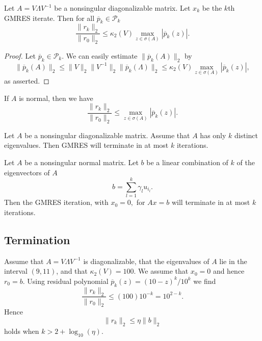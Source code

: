 \begin{thm}
  Let $A=V\Lambda V^{-1}$ be a nonsingular diagonalizable matrix. Let
  $x_k$ be the $k$th GMRES iterate. Then for all
  $\overline{p}_k\in\mathcal{P}_k$
  \begin{equation}
    \label{eq:3.4}
    \frac{\|r_k\|_2}{\|r_0\|_2}\leq \kappa_2(V)\max_{z\in\sigma(A)}|\overline{p}_k(z)|.
  \end{equation}
\end{thm}

\begin{proof}
  Let $\overline{p}_k\in\mathcal{P}_k.$ We can easily estimate
  $\|\overline{p}_k(A)\|_2$ by
  $$\|\overline{p}_k(A)\|_2\leq
  \|V\|_2\|V^{-1}\|_2\|\overline{p}_k(\Lambda)\|_2\leq
  \kappa_2(V)\max_{z\in\sigma(A)}|\overline{p}_k(z)|,$$
  as asserted.
\end{proof}

\begin{coro}
  If $A$ is normal, then we have
  $$\frac{\|r_k\|_2}{\|r_0\|_2}\leq\max_{z\in\sigma(A)}|\overline{p}_k(z)|.$$
\end{coro}

\begin{thm}
  Let $A$ be a nonsingular diagonalizable matrix. Assume that $A$ has
  only $k$ distinct eigenvalues. Then GMRES will terminate in at most
  $k$ iterations.
\end{thm}

\begin{thm}
  Let $A$ be a nonsingular normal matrix. Let $b$ be a linear
  combination of $k$ of the eigenvectors of $A$
  $$b=\sum\limits_{l=1}^k\gamma_lu_{i_l}.$$
  Then the GMRES iteration, with $x_0=0,$ for $Ax=b$ will terminate in
  at most $k$ iterations.
\end{thm}

\subsection{Termination}
\label{sec:3.2}

\begin{exm}
  Assume that $A=V\Lambda V^{-1}$ is diagonalizable, that the
  eigenvalues of $A$ lie in the interval $(9,11)$, and that
  $\kappa_2(V)=100$. We assume that $x_0=0$ and hence $r_0=b$. Using
  residual polynomial $\overline{p}_k(z)=(10-z)^k/10^k$ we find
  $$\frac{\|r_k\|_2}{\|r_0\|_2}\leq (100)10^{-k}=10^{2-k}.$$
  Hence
  \begin{equation}
    \label{eq:3.5}
    \|r_k\|_2\leq\eta\|b\|_2
  \end{equation}
  holds when $k>2+\log_{10}(\eta).$
\end{exm}

